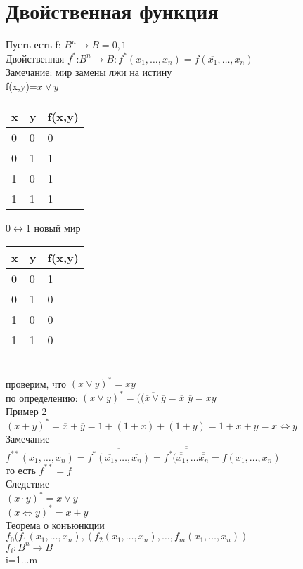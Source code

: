 \documentclass{article}
\begin{document}
\section{Двойственная функция}
Пусть есть f: $B^n\rightarrow B={0,1}$\\
Двойственная $f^*$:$B^n\rightarrow B: f^*(x_1,\dots,x_n)=\overline{f(\overline{x_1},\dots,x_n)}$\\
Замечание: мир замены лжи на истину\\
f(x,y)=$x\vee y$\\
\begin{tabular}{ll|l}
 x&y&f(x,y)\\
\hline
0 & 0 &0\\
0 &  1 & 1\\
1 &  0 & 1\\
1&  1 & 1\\
\end{tabular}
0$\leftrightarrow$1 новый мир\begin{tabular}{ll|l}
 x&y&f(x,y)\\
\hline
0 & 0 &1\\
0 &  1 & 0\\
1 &  0 & 0\\
1&  1 & 0\\
\end{tabular}\\
проверим, что $(x\vee y)^*=xy$\\
по определению: $(x\vee y)^*=(\overline{(\overline{x}\vee \overline{y}}=\overline{\overline{x}}$ $\overline{\overline{y}}=xy$\\
Пример 2\\
$(x+y)^*=\overline{\overline{x}+\overline{y}}=1+(1+x)+(1+y)=1+x+y=x\Leftrightarrow y$\\
Замечание\\
$f^{**}(x_1,\dots,x_n)=\overline{f^*(\overline{x_1},\dots,\overline{x_n})}=\overline{\overline{f^*(\overline{\overline{x_1}},\dots\overline{\overline{x_n}}}}=f(x_1,\dots,x_n)$\\
то есть $f^{**}=f$\\
Следствие\\
$(x\cdot y)^*=x\vee y$\\
$(x\Leftrightarrow y)^*=x+y$\\
\underline{Теорема о конъюнкции}\\
$f_0(f_1(x_1,\dots,x_n),(f_2(x_1,\dots,x_n),\dots,f_m(x_1,\dots,x_n))$\\
$f_i:B^n\rightarrow B$\\
i=1$\dots$m\\
\end{document}
